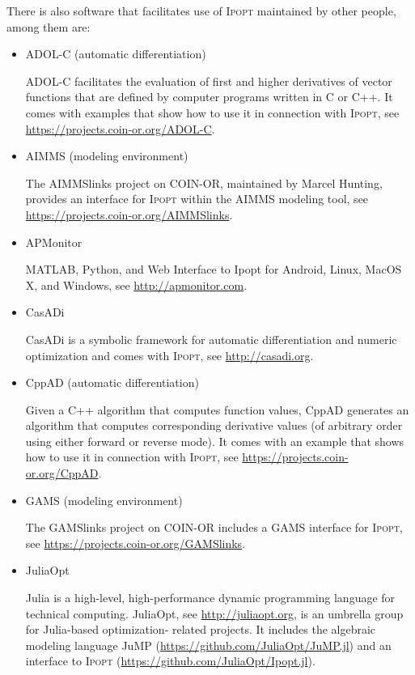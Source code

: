 \documentclass[10pt]{article}
\newcommand{\Ipopt}{\textsc{Ipopt}\xspace}
\begin{document}
There is also software that facilitates use of \Ipopt maintained by other people, among them are:
\begin{itemize}
\item ADOL-C (automatic differentiation)

  ADOL-C facilitates the evaluation of first and higher derivatives of
  vector functions that are defined by computer programs written in C or C++.
  It comes with examples that show how to use it in connection with \Ipopt, see
  \url{https://projects.coin-or.org/ADOL-C}.
    
\item AIMMS (modeling environment)

  The AIMMSlinks project on COIN-OR, maintained by Marcel Hunting,
  provides an interface for \Ipopt within the AIMMS modeling tool, see
  \url{https://projects.coin-or.org/AIMMSlinks}.

\item APMonitor

  MATLAB, Python, and Web Interface to Ipopt for Android, Linux, MacOS X,
  and Windows, see \url{http://apmonitor.com}.

\item CasADi

  CasADi is a symbolic framework for automatic differentiation and
  numeric optimization and comes with \Ipopt, see
  \url{http://casadi.org}.

\item CppAD (automatic differentiation)

  Given a C++ algorithm that computes function values, CppAD generates an
  algorithm that computes corresponding derivative values (of arbitrary
  order using either forward or reverse mode).
  It comes with an example that shows how to use it in connection with \Ipopt, see
  \url{https://projects.coin-or.org/CppAD}.

\item GAMS (modeling environment)

  The GAMSlinks project on COIN-OR includes a GAMS interface for \Ipopt, see
  \url{https://projects.coin-or.org/GAMSlinks}.
  
\item JuliaOpt

  Julia is a high-level, high-performance dynamic programming language for technical computing.
  JuliaOpt, see \url{http://juliaopt.org}, is an umbrella group for Julia-based optimization-
  related projects. It includes the algebraic modeling language JuMP
  (\url{https://github.com/JuliaOpt/JuMP.jl}) and an interface to \Ipopt
  (\url{https://github.com/JuliaOpt/Ipopt.jl}).


\end{itemize}
\end{document}

